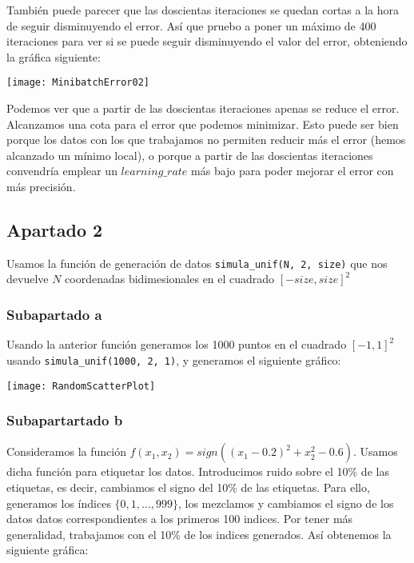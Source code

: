 \documentclass[11pt]{article}
\begin{document}
También puede parecer que las doscientas iteraciones se quedan cortas a la hora de seguir disminuyendo el error. Así que pruebo a poner un máximo de 400 iteraciones para ver si se puede seguir disminuyendo el valor del error, obteniendo la gráfica siguiente:

\texttt{[image: MinibatchError02]}

Podemos ver que a partir de las doscientas iteraciones apenas se reduce el error. Alcanzamos una cota para el error que podemos minimizar. Esto puede ser bien porque los datos con los que trabajamos no permiten reducir más el error (hemos alcanzado un mínimo local), o porque a partir de las doscientas iteraciones convendría emplear un $learning\_rate$ más bajo para poder mejorar el error con más precisión.

\pagebreak

\subsection{Apartado 2}

Usamos la función de generación de datos \lstinline{simula_unif(N, 2, size)} que nos devuelve $N$ coordenadas bidimesionales en el cuadrado $[-size, size]^2$

\subsubsection{Subapartado a}

Usando la anterior función generamos los 1000 puntos en el cuadrado $[-1, 1]^2$ usando \lstinline{simula_unif(1000, 2, 1)}, y generamos el siguiente gráfico:

\texttt{[image: RandomScatterPlot]}

\subsubsection{Subapartartado b}

Consideramos la función $f(x_1, x_2) = sign((x_1 - 0.2)^2 + x_2^2 - 0.6)$. Usamos dicha función para etiquetar los datos. Introducimos ruido sobre el 10\% de las etiquetas, es decir, cambiamos el signo del 10\% de las etiquetas. Para ello, generamos los índices $\{0, 1, \ldots, 999\}$, los mezclamos y cambiamos el signo de los datos datos correspondientes a los primeros 100 indices. Por tener más generalidad, trabajamos con el 10\% de los indices generados. Así obtenemos la siguiente gráfica:
\end{document}

